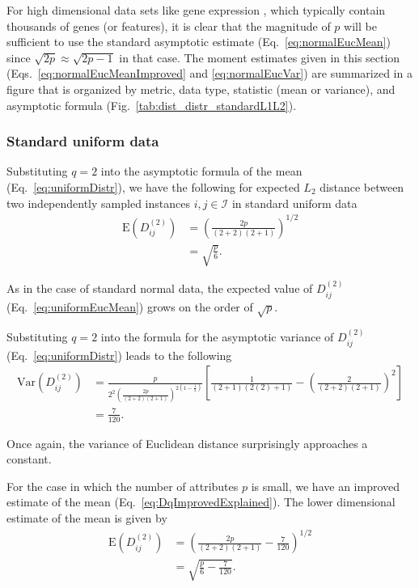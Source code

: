 \documentclass[10pt,letterpaper]{article}
\begin{document}
For high dimensional data sets like gene expression \cite{brazma2000,wang2018}, which typically contain thousands of genes (or features), it is clear that the magnitude of $p$ will be sufficient to use the standard asymptotic estimate (Eq.~\ref{eq:normalEucMean}) since $\sqrt{2p} \approx \sqrt{2p - 1}$ in that case. The moment estimates given in this section (Eqs.~\ref{eq:normalEucMeanImproved} and \ref{eq:normalEucVar}) are summarized in a figure that is organized by metric, data type, statistic (mean or variance), and asymptotic formula (Fig.~\ref{tab:dist_distr_standardL1L2}).

\subsubsection*{Standard uniform data}

Substituting $q=2$ into the asymptotic formula of the mean (Eq.~\ref{eq:uniformDistr}), we have the following for expected $L_2$ distance between two independently sampled instances $i,j \in \mathcal{I}$ in standard uniform data
%
\begin{equation}\label{eq:uniformEucMean}
\begin{aligned}
\text{E}\left(D^{(2)}_{ij}\right) &= \left(\frac{2p}{(2+2)(2+1)}\right)^{1/2} \\
&= \sqrt{\frac{p}{6}}.
\end{aligned}
\end{equation}

As in the case of standard normal data, the expected value of $D^{(2)}_{ij}$ (Eq.~\ref{eq:uniformEucMean}) grows on the order of $\sqrt{p}$. 

Substituting $q=2$ into the formula for the asymptotic variance of $D^{(2)}_{ij}$ (Eq.~\ref{eq:uniformDistr}) leads to the following
%
\begin{equation}\label{eq:uniformEucVar}
\begin{aligned}
\text{Var}\left(D^{(2)}_{ij}\right) &= \frac{p}{2^2\left(\frac{2p}{(2 + 2)(2 + 1)}\right)^{2\left(1 - \frac{1}{2}\right)}}\left[\frac{1}{(2 + 1)(2(2) + 1)} - \left(\frac{2}{(2 + 2)(2 + 1)}\right)^2\right] \\
&= \frac{7}{120}.
\end{aligned}
\end{equation}

Once again, the variance of Euclidean distance surprisingly approaches a constant.

For the case in which the number of attributes $p$ is small, we have an improved estimate of the mean (Eq.~\ref{eq:DqImprovedExplained}). The lower dimensional estimate of the mean is given by
%
\begin{equation}\label{eq:uniformEucMeanImproved}
\begin{aligned}
\text{E}\left(D^{(2)}_{ij}\right) &= \left(\frac{2p}{(2+2)(2+1)} - \frac{7}{120}\right)^{1/2} \\
&= \sqrt{\frac{p}{6} - \frac{7}{120}}.
\end{aligned}
\end{equation}
\end{document}

